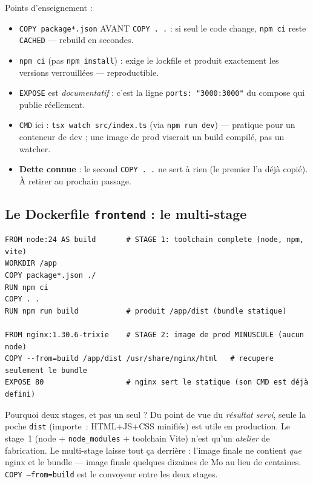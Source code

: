 \documentclass[11pt,a4paper]{article}
\begin{document}
Points d'enseignement :
\begin{itemize}[nosep]
  \item \texttt{COPY package*.json} AVANT \texttt{COPY . .} : si seul le code
        change, \texttt{npm ci} reste \texttt{CACHED} --- rebuild en secondes.
  \item \texttt{npm ci} (pas \texttt{npm install}) : exige le lockfile et
        produit exactement les versions verrouillées --- reproductible.
  \item \texttt{EXPOSE} est \emph{documentatif} : c'est la ligne
        \texttt{ports: "3000:3000"} du compose qui publie réellement.
  \item \texttt{CMD} ici : \texttt{tsx watch src/index.ts} (via
        \texttt{npm run dev}) --- pratique pour un conteneur de dev ; une
        image de prod viserait un build compilé, pas un watcher.
  \item \textbf{Dette connue} : le second \texttt{COPY . .} ne sert à rien
        (le premier l'a déjà copié). À retirer au prochain passage.
\end{itemize}

\subsection{Le Dockerfile \texttt{frontend} : le multi-stage}

\begin{lstlisting}[language=docker]
FROM node:24 AS build       # STAGE 1: toolchain complete (node, npm, vite)
WORKDIR /app
COPY package*.json ./
RUN npm ci
COPY . .
RUN npm run build           # produit /app/dist (bundle statique)

FROM nginx:1.30.6-trixie    # STAGE 2: image de prod MINUSCULE (aucun node)
COPY --from=build /app/dist /usr/share/nginx/html   # recupere seulement le bundle
EXPOSE 80                   # nginx sert le statique (son CMD est déjà defini)
\end{lstlisting}

\begin{conceptbox}{Pourquoi deux stages, et pas un seul ?}
Du point de vue du \emph{résultat servi}, seule la poche \texttt{dist}
(importe~: HTML+JS+CSS minifiés) est utile en production. Le stage~1
(node $+$ \texttt{node\_modules} $+$ toolchain Vite) n'est qu'un \emph{atelier}
de fabrication. Le multi-stage laisse tout ça derrière : l'image finale ne
contient \emph{que} nginx et le bundle --- image finale quelques dizaines de
Mo au lieu de centaines. \texttt{COPY --from=build} est le convoyeur entre
les deux stages.
\end{conceptbox}
\end{document}
